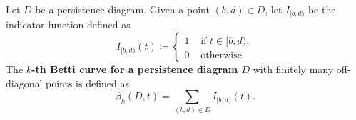 \begin{definition}
    Let $ D $ be a persistence diagram. Given a point $ (b,d) \in D $, let $ I_{[b,d)} $ be the indicator function defined as
    \begin{equation}
        I_{[b,d)}(t) \coloneq \begin{cases}
            1 &\text{ if } t \in [b,d), \\
            0 &\text{ otherwise}.
        \end{cases}
    \end{equation}
    The {\bf $k$-th Betti curve for a persistence diagram $ D $} with finitely many off-diagonal points is defined as
    \begin{equation}
        \beta_k(D, t) = \sum_{(b, d) \in D} I_{[b,d)}(t).
    \end{equation}
\end{definition}

